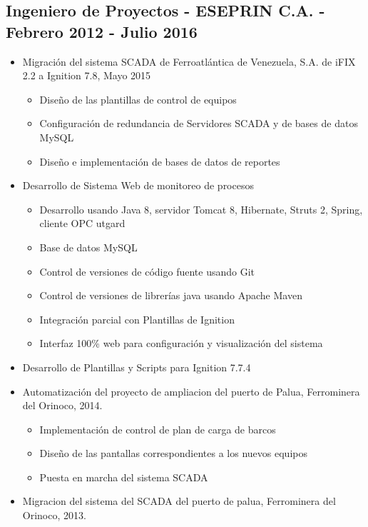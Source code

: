 \documentclass[letterpaper,11pt]{report}
\begin{document}
\subsection*{Ingeniero de Proyectos - ESEPRIN C.A. - Febrero 2012 - Julio 2016}
  \begin{itemize}
    \item Migración del sistema SCADA de Ferroatlántica de Venezuela, S.A. de iFIX 2.2 a Ignition 7.8, Mayo 2015
        \begin{itemize}
            \item Diseño de las plantillas de control de equipos
            \item Configuración de redundancia de Servidores SCADA y de bases de datos MySQL
            \item Diseño e implementación de bases de datos de reportes
        \end{itemize}
    \item Desarrollo de Sistema Web de monitoreo de procesos
        \begin{itemize}
        \item Desarrollo usando Java 8, servidor Tomcat 8, Hibernate, Struts 2, Spring, cliente OPC utgard
        \item Base de datos MySQL
        \item Control de versiones de código fuente usando Git
        \item Control de versiones de librerías java usando Apache Maven
        \item Integración parcial con Plantillas de Ignition
        \item Interfaz 100\% web para configuración y visualización del sistema
        \end{itemize}
    \item Desarrollo de Plantillas y Scripts para Ignition 7.7.4
    \item Automatización del proyecto de ampliacion del puerto de Palua, Ferrominera del Orinoco, 2014.
      \begin{itemize}
        \item Implementación de control de plan de carga de barcos
        \item Diseño de las pantallas correspondientes a los nuevos equipos
        \item Puesta en marcha del sistema SCADA
      \end{itemize}
    \item Migracion del sistema del SCADA del puerto de palua, Ferrominera del Orinoco, 2013.

\end{itemize}
\end{document}
